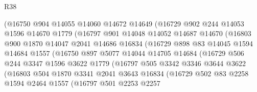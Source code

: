 \begin{lexlean}{R38}
\begin{coremodule}
                    (@16750
                      @904
                      @14055
                      @14060
                      @14672
                      @14649
                      (@16729
                        @902
                        @244
                        @14053
                        @1596
                        @14670
                        @1779
                        (@16797
                          @901
                          @14048
                          @14052
                          @14687
                          @14670
                          (@16803
                            @900
                            @1870
                            @14047
                            @2041
                            @14686
                            @16834
                            (@16729
                              @898
                              @83
                              @14045
                              @1594
                              @14684
                              @1557
                              (@16750
                                @897
                                @5077
                                @14044
                                @14705
                                @14684
                                (@16729
                                  @506
                                  @244
                                  @3347
                                  @1596
                                  @3622
                                  @1779
                                  (@16797
                                    @505
                                    @3342
                                    @3346
                                    @3644
                                    @3622
                                    (@16803
                                      @504
                                      @1870
                                      @3341
                                      @2041
                                      @3643
                                      @16834
                                      (@16729
                                        @502
                                        @83
                                        @2258
                                        @1594
                                        @2464
                                        @1557
                                        (@16797
                                          @501
                                          @2253
                                          @2257

\end{coremodule}
\end{lexlean}
